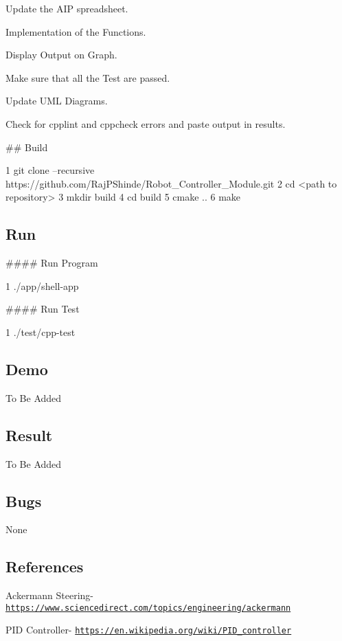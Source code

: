 \begin{DoxyItemize}
\item Update the A\+IP spreadsheet.
\item Implementation of the Functions.
\item Display Output on Graph.
\item Make sure that all the Test are passed.
\item Update U\+ML Diagrams.
\item Check for cpplint and cppcheck errors and paste output in results.
\end{DoxyItemize}

\#\# Build 
\begin{DoxyCode}
1 git clone --recursive https://github.com/RajPShinde/Robot\_Controller\_Module.git
2 cd <path to repository>
3 mkdir build
4 cd build
5 cmake ..
6 make
\end{DoxyCode}
 \subsection*{Run}

\#\#\#\# Run Program 
\begin{DoxyCode}
1 ./app/shell-app
\end{DoxyCode}
 \#\#\#\# Run Test 
\begin{DoxyCode}
1 ./test/cpp-test
\end{DoxyCode}
 \subsection*{Demo}

To Be Added

\subsection*{Result}

To Be Added

\subsection*{Bugs}

None

\subsection*{References}


\begin{DoxyItemize}
\item Ackermann Steering-\/ \href{https://www.sciencedirect.com/topics/engineering/ackermann}{\tt https\+://www.\+sciencedirect.\+com/topics/engineering/ackermann}
\item P\+ID Controller-\/ \href{https://en.wikipedia.org/wiki/PID_controller}{\tt https\+://en.\+wikipedia.\+org/wiki/\+P\+I\+D\+\_\+controller} 
\end{DoxyItemize}
